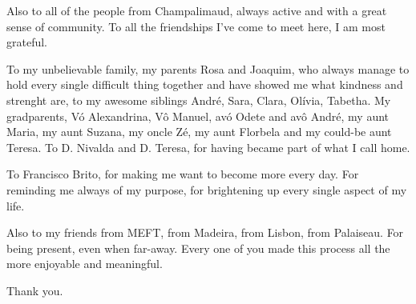 Also to all of the people from Champalimaud, always active and with a great sense of community. To all the friendships I've come to meet here, I am most grateful.

To my unbelievable family, my parents Rosa and Joaquim, who always manage to hold every single difficult thing together and have showed me what kindness and strenght are, to my awesome siblings André, Sara, Clara, Olívia, Tabetha. My gradparents, Vó Alexandrina, Vô Manuel, avó Odete and avô André, my aunt Maria, my aunt Suzana, my oncle Zé, my aunt Florbela and my could-be aunt Teresa. To D. Nivalda and D. Teresa, for having became part of what I call home.

To Francisco Brito, for making me want to become more every day. For reminding me always of my purpose, for brightening up every single aspect of my life.

Also to my friends from MEFT, from Madeira, from Lisbon, from Palaiseau. For being present, even when far-away. Every one of you made this process all the more enjoyable and meaningful.

Thank you.

\clearpage
\thispagestyle{empty}
\cleardoublepage